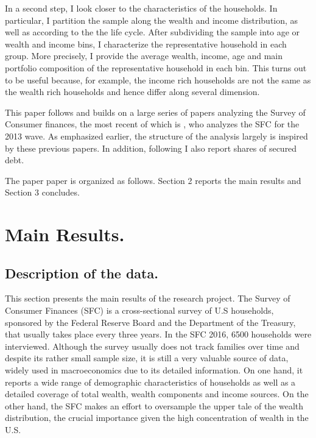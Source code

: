 \documentclass[11pt, a4paper, leqno]{article}
\begin{document}
    In a second step, I look closer to the characteristics of the households. In particular, I partition the sample along the wealth and income distribution, as well as according to the the life cycle. After subdividing the sample into age or wealth and income bins, I characterize the representative household in each group. More precisely, I provide the average wealth, income, age and main portfolio composition of the representative household in each bin. This turns out to be useful because, for example, the income rich households are not the same as the wealth rich households and hence differ along several dimension. 

    This paper follows and builds on a large series of papers analyzing the Survey of Consumer finances, the most recent of which is \citet{Kuhn2016}, who analyzes the SFC for the 2013 wave. As emphasized earlier, the structure of the analysis largely is inspired by these previous papers. In addition, following \citet{Hintermaier2016} I also report shares of secured debt.

    The paper paper is organized as follows. Section 2 reports the main results and Section 3 concludes.


\section{Main Results.}
\label{sec:mainresults}

\subsection*{Description of the data.}

This section presents the main results of the research project. The Survey of Consumer Finances (SFC) is a cross-sectional survey of U.S households, sponsored by the Federal Reserve Board and the Department of the Treasury, that usually takes place every three years. In the SFC 2016, 6500 households were interviewed. Although the survey usually does not track families over time and despite its rather small sample size, it is still a very valuable source of data, widely used in macroeconomics due to its detailed information. On one hand, it reports a wide range of demographic characteristics of households as well as a detailed coverage of total wealth, wealth components and income sources. On the other hand, the SFC makes an effort to oversample the upper tale of the wealth distribution, the crucial importance given the high concentration of wealth in the U.S. 
\end{document}
